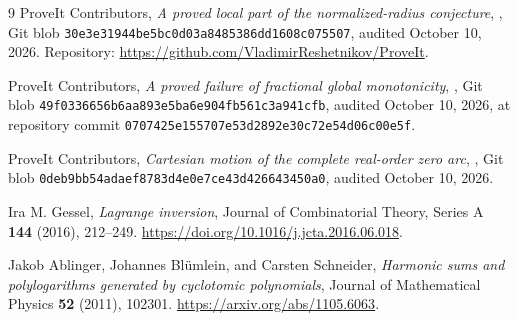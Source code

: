 \begin{thebibliography}{9}
ProveIt Contributors,
\emph{A proved local part of the normalized-radius conjecture},
,
Git blob \texttt{30e3e31944be5bc0d03a8485386dd1608c075507},
audited October 10, 2026.
Repository: \url{https://github.com/VladimirReshetnikov/ProveIt}.

ProveIt Contributors,
\emph{A proved failure of fractional global monotonicity},
,
Git blob \texttt{49f0336656b6aa893e5ba6e904fb561c3a941cfb},
audited October 10, 2026, at repository commit
\texttt{0707425e155707e53d2892e30c72e54d06c00e5f}.

ProveIt Contributors,
\emph{Cartesian motion of the complete real-order zero arc},
,
Git blob \texttt{0deb9bb54adaef8783d4e0e7ce43d426643450a0},
audited October 10, 2026.

Ira M. Gessel,
\emph{Lagrange inversion},
Journal of Combinatorial Theory, Series A \textbf{144} (2016), 212--249.
\url{https://doi.org/10.1016/j.jcta.2016.06.018}.

Jakob Ablinger, Johannes Bl\"umlein, and Carsten Schneider,
\emph{Harmonic sums and polylogarithms generated by cyclotomic polynomials},
Journal of Mathematical Physics \textbf{52} (2011), 102301.
\url{https://arxiv.org/abs/1105.6063}.
\end{thebibliography}
